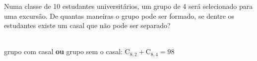 \begin{ex}
Numa classe de 10 estudantes universitários, um grupo de 4 será selecionado para uma excursão. De quantas maneiras o grupo pode ser formado, se dentre os estudantes existe um casal que não pode ser separado?
  \begin{sol}
   \phantom{A} \\
   grupo com casal \textbf{ou} grupo sem o casal: $\mathrm{C}_{8,2}+\mathrm{C}_{8,4}=98$
  \end{sol}
\end{ex}